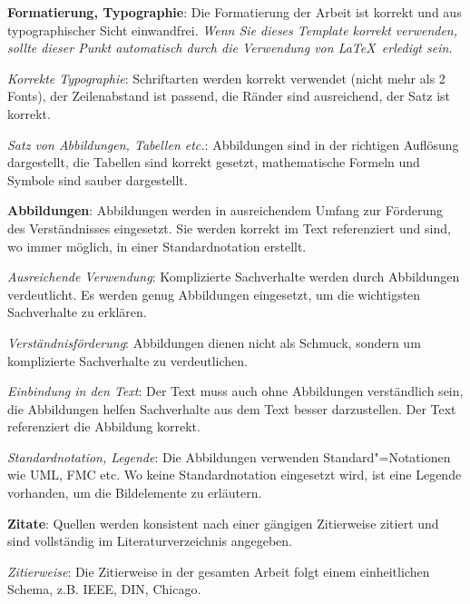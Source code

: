 \begin{checklist}
\begin{checklist}
    \end{checklist}
  \item \textbf{Formatierung, Typographie}: Die Formatierung der Arbeit ist korrekt und aus typographischer Sicht einwandfrei. \textit{Wenn Sie dieses Template korrekt verwenden, sollte dieser Punkt automatisch durch die Verwendung von \LaTeX \ erledigt sein.}
    \begin{checklist}
        \item \textit{Korrekte Typographie}: Schriftarten werden korrekt verwendet (nicht mehr als 2 Fonts), der Zeilenabstand ist passend, die Ränder sind ausreichend, der Satz ist korrekt.
        \item \textit{Satz von Abbildungen, Tabellen etc.}: Abbildungen sind in der richtigen Auflösung dargestellt, die Tabellen sind korrekt gesetzt, mathematische Formeln und Symbole sind sauber dargestellt.
    \end{checklist}
  \item \textbf{Abbildungen}: Abbildungen werden in ausreichendem Umfang zur Förderung des Verständnisses eingesetzt. Sie werden korrekt im Text referenziert und sind, wo immer möglich, in einer Standardnotation erstellt.
    \begin{checklist}
        \item \textit{Ausreichende Verwendung}: Komplizierte Sachverhalte werden durch Abbildungen verdeutlicht. Es werden genug Abbildungen eingesetzt, um die wichtigsten Sachverhalte zu erklären.
        \item \textit{Verständnisförderung}: Abbildungen dienen nicht als Schmuck, sondern um komplizierte Sachverhalte zu verdeutlichen.
        \item \textit{Einbindung in den Text}: Der Text muss auch ohne Abbildungen verständlich sein, die Abbildungen helfen Sachverhalte aus dem Text besser darzustellen. Der Text referenziert die Abbildung korrekt.
        \item \textit{Standardnotation, Legende}: Die Abbildungen verwenden Standard"=Notationen wie UML, FMC etc. Wo keine Standardnotation eingesetzt wird, ist eine Legende vorhanden, um die Bildelemente zu erläutern.
    \end{checklist}
  \item \textbf{Zitate}: Quellen werden konsistent nach einer gängigen Zitierweise zitiert und sind vollständig im Literaturverzeichnis angegeben.
    \begin{checklist}
        \item \textit{Zitierweise}: Die Zitierweise in der gesamten Arbeit folgt einem einheitlichen Schema, z.B. IEEE, DIN, Chicago.

\end{checklist}
\end{checklist}
